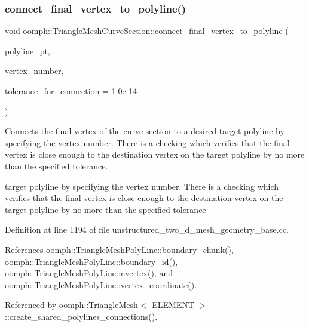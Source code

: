 \subsubsection{\texorpdfstring{connect\+\_\+final\+\_\+vertex\+\_\+to\+\_\+polyline()}{connect\_final\_vertex\_to\_polyline()}}
{\footnotesize\ttfamily void oomph\+::\+Triangle\+Mesh\+Curve\+Section\+::connect\+\_\+final\+\_\+vertex\+\_\+to\+\_\+polyline (\begin{DoxyParamCaption}\item[{\hyperlink{classoomph_1_1TriangleMeshPolyLine}{Triangle\+Mesh\+Poly\+Line} $\ast$}]{polyline\+\_\+pt,  }\item[{const unsigned \&}]{vertex\+\_\+number,  }\item[{const double \&}]{tolerance\+\_\+for\+\_\+connection = {\ttfamily 1.0e-\/14} }\end{DoxyParamCaption})}



Connects the final vertex of the curve section to a desired target polyline by specifying the vertex number. There is a checking which verifies that the final vertex is close enough to the destination vertex on the target polyline by no more than the specified tolerance. 

target polyline by specifying the vertex number. There is a checking which verifies that the final vertex is close enough to the destination vertex on the target polyline by no more than the specified tolerance 

Definition at line 1194 of file unstructured\+\_\+two\+\_\+d\+\_\+mesh\+\_\+geometry\+\_\+base.\+cc.



References oomph\+::\+Triangle\+Mesh\+Poly\+Line\+::boundary\+\_\+chunk(), oomph\+::\+Triangle\+Mesh\+Poly\+Line\+::boundary\+\_\+id(), oomph\+::\+Triangle\+Mesh\+Poly\+Line\+::nvertex(), and oomph\+::\+Triangle\+Mesh\+Poly\+Line\+::vertex\+\_\+coordinate().



Referenced by oomph\+::\+Triangle\+Mesh$<$ E\+L\+E\+M\+E\+N\+T $>$\+::create\+\_\+shared\+\_\+polylines\+\_\+connections().

\mbox{\label{classoomph_1_1TriangleMeshCurveSection_acda559ecf86d962ed1d1594e3588a87c}} 
